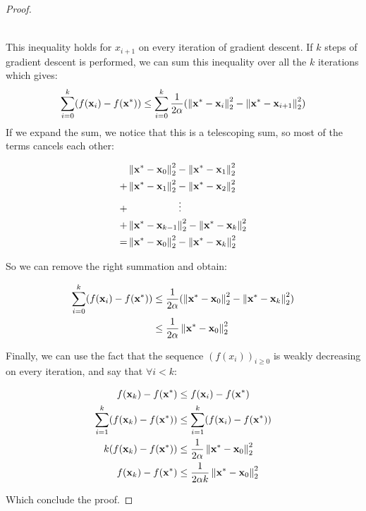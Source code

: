 \begin{proof}
\begin{ceqn}
\begin{align*}
        \end{align*}
    \end{ceqn}
    This inequality holds for $x_{i+1}$ on every iteration of gradient descent. If $k$ steps of gradient descent is performed, we can sum this inequality over all the $k$ iterations which gives:
    $$\sum_{i=0}^{k}(f(\vx_i) - f(\vx^*)) \leq \sum_{i=0}^{k} \frac{1}{2\alpha} (\norm{\vx^* - \vx_i}^2_2 - \norm{\vx^* - \vx_{i+1}}^2_2)$$
    If we expand the sum, we notice that this is a telescoping sum, so most of the terms cancels each other:
    \begin{ceqn}
        \begin{align*}
            & \norm{\vx^* - \vx_0}^2_2 - \norm{\vx^* - \vx_1}^2_2 \\
            +& \norm{\vx^* - \vx_1}^2_2 - \norm{\vx^* - \vx_2}^2_2 \\
            +& \hspace{0.72in} \vdots \\
            +& \norm{\vx^* - \vx_{k-1}}^2_2 - \norm{\vx^* - \vx_k}^2_2 \\
            =& \norm{\vx^* - \vx_0}^2_2 - \norm{\vx^* - \vx_k}^2_2
        \end{align*}
    \end{ceqn}
    So we can remove the right summation and obtain:
    \begin{ceqn}
        \begin{align*}
            \sum_{i=0}^{k}(f(\vx_i) - f(\vx^*)) &\leq \frac{1}{2\alpha} (\norm{\vx^* - \vx_0}^2_2 - \norm{\vx^* - \vx_k}^2_2) \\
            &\leq \frac{1}{2\alpha} \norm{\vx^* - \vx_0}^2_2
        \end{align*}
    \end{ceqn}
    Finally, we can use the fact that the sequence $(f(x_i))_{i \geq 0}$ is weakly decreasing on every iteration, and say that $\forall i < k$:
    \begin{ceqn}
        \begin{align*}
            f(\vx_k) - f(\vx^*) &\leq f(\vx_i) - f(\vx^*) \\
            \sum_{i=1}^{k}(f(\vx_k) - f(\vx^*)) &\leq \sum_{i=1}^{k}(f(\vx_i) - f(\vx^*)) \\
            k(f(\vx_k) - f(\vx^*)) &\leq \frac{1}{2\alpha} \norm{\vx^* - \vx_0}^2_2 \\
            f(\vx_k) - f(\vx^*) &\leq \frac{1}{2\alpha k} \norm{\vx^* - \vx_0}^2_2
        \end{align*}
    \end{ceqn}
    Which conclude the proof.
\end{proof}


